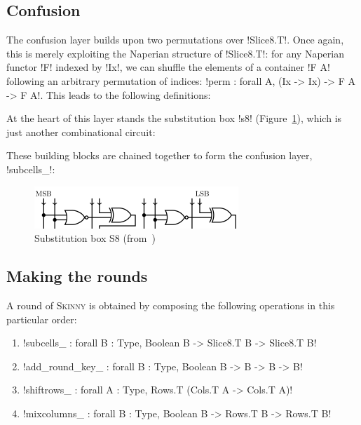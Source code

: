\documentclass[draft,english]{jflart}
\newcommand{\Skinny}{\textsc{Skinny}}
\begin{document}
\subsection{Confusion}


The confusion layer builds upon two permutations over \coqe!Slice8.T!.
Once again, this is merely exploiting the Naperian structure of
\coqe!Slice8.T!: for any Naperian functor \coqe!F! indexed by
\coqe!Ix!, we can shuffle the elements of a container \coqe!F A! following an arbitrary permutation of indices:
%
\coqe!perm : forall A, (Ix -> Ix) -> F A -> F A!.
%
This leads to the following definitions:
%


At the heart of this layer stands the substitution box \coqe!s8!
(Figure~\ref{fig:s8}), which is just another combinational circuit:
%

These building blocks are chained together to form the confusion
layer, \coqe!subcells_!:
%

\begin{figure}
  \centering
  \includegraphics[draft=false,width=.75\textwidth]{s8}
  \caption{Substitution box S8 (from~\citet{beierle:skinny})}
  \label{fig:s8}
\end{figure}

\subsection{Making the rounds}
\label{sec:assembling}


A round of \Skinny{} is obtained by composing the following operations in
this particular order:
%
\begin{enumerate}
\item \coqe!subcells_ : forall {B : Type}, Boolean B -> Slice8.T B -> Slice8.T B!
\item \coqe!add_round_key_ : forall {B : Type}, Boolean B -> B -> B -> B!
\item \coqe!shiftrows_ : forall {A : Type}, Rows.T (Cols.T A -> Cols.T A)!
\item \coqe!mixcolumns_ : forall {B : Type}, Boolean B -> Rows.T B -> Rows.T B!
\end{enumerate}
\end{document}
